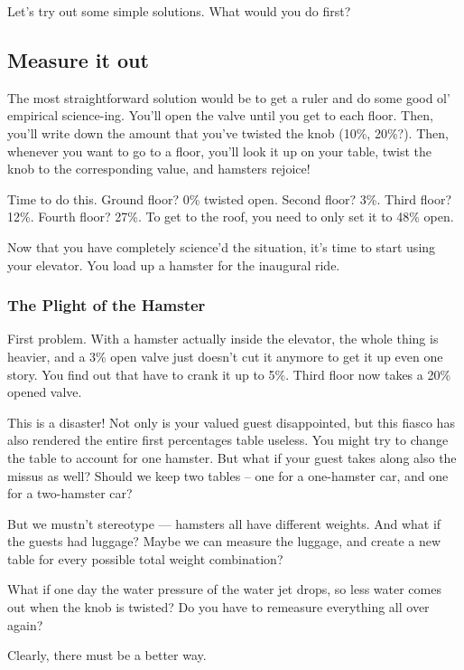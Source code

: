\documentclass[]{article}
\begin{document}
Let's try out some simple solutions. What would you do first?

\subsection{Measure it out}\label{measure-it-out}

The most straightforward solution would be to get a ruler and do some good ol'
empirical science-ing. You'll open the valve until you get to each floor. Then,
you'll write down the amount that you've twisted the knob (10\%, 20\%?). Then,
whenever you want to go to a floor, you'll look it up on your table, twist the
knob to the corresponding value, and hamsters rejoice!

Time to do this. Ground floor? 0\% twisted open. Second floor? 3\%. Third floor?
12\%. Fourth floor? 27\%. To get to the roof, you need to only set it to 48\%
open.

Now that you have completely science'd the situation, it's time to start using
your elevator. You load up a hamster for the inaugural ride.

\subsubsection{The Plight of the Hamster}\label{the-plight-of-the-hamster}

First problem. With a hamster actually inside the elevator, the whole thing is
heavier, and a 3\% open valve just doesn't cut it anymore to get it up even one
story. You find out that have to crank it up to 5\%. Third floor now takes a
20\% opened valve.

This is a disaster! Not only is your valued guest disappointed, but this fiasco
has also rendered the entire first percentages table useless. You might try to
change the table to account for one hamster. But what if your guest takes along
also the missus as well? Should we keep two tables -- one for a one-hamster car,
and one for a two-hamster car?

But we mustn't stereotype --- hamsters all have different weights. And what if
the guests had luggage? Maybe we can measure the luggage, and create a new table
for every possible total weight combination?

What if one day the water pressure of the water jet drops, so less water comes
out when the knob is twisted? Do you have to remeasure everything all over
again?

Clearly, there must be a better way.
\end{document}
